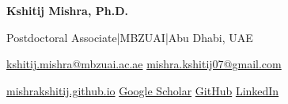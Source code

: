 {\sffamily\fontsize{23}{27}\selectfont\bfseries Kshitij Mishra, Ph.D.}\par\vspace{3pt}
{\sffamily\fontsize{10.5}{13}\selectfont Postdoctoral Associate\enspace |\enspace MBZUAI\enspace |\enspace Abu Dhabi, UAE}\par\vspace{3pt}
{\fontsize{10}{12}\selectfont
\href{mailto:kshitij.mishra@mbzuai.ac.ae}{kshitij.mishra@mbzuai.ac.ae}\enspace\textcolor{MarkerColour}{\textbullet}\enspace
\href{mailto:mishra.kshitij07@gmail.com}{mishra.kshitij07@gmail.com}\par
\href{https://mishrakshitij.github.io/}{mishrakshitij.github.io}\enspace\textcolor{MarkerColour}{\textbullet}\enspace
\href{https://scholar.google.com/citations?user=jfTVBUQAAAAJ}{Google Scholar}\enspace\textcolor{MarkerColour}{\textbullet}\enspace
\href{https://github.com/Mishrakshitij}{GitHub}\enspace\textcolor{MarkerColour}{\textbullet}\enspace
\href{https://www.linkedin.com/in/kshitij-mishra-6770451b1}{LinkedIn}}


